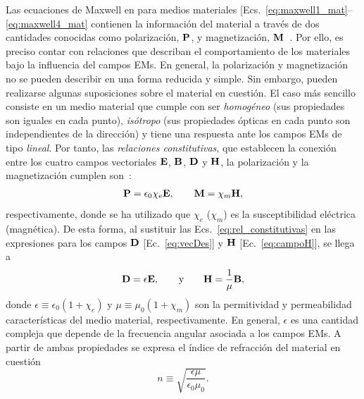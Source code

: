 Las ecuaciones de Maxwell en para medios materiales  [Ecs.~\eqref{eq:maxwell1_mat}--\eqref{eq:maxwell4_mat} contienen la información del material a través de dos cantidades conocidas como polarización, $\vb{P}$, y magnetización, $\vb{M}$~\cite{griffiths2013electrodynamics}. Por ello, es preciso contar con relaciones que describan el comportamiento de los materiales bajo la influencia del campos EMs. En general, la polarización y magnetización no se pueden describir en una forma reducida y simple. Sin embargo, pueden realizarse algunas suposiciones sobre el material en cuestión. El caso más sencillo consiste en un medio material que cumple con ser \textit{homogéneo} (sus propiedades son iguales en cada punto), \textit{isótropo} (sus propiedades ópticas en cada punto son independientes de la dirección) y tiene una respuesta ante los campos EMs de tipo \textit{lineal}. Por tanto, las \textit{relaciones constitutivas}, que establecen la conexión entre los cuatro campos vectoriales $\vb{E}$, $\vb{B}$, $\vb{D}$ y $\vb{H}$, la polarización y la magnetización cumplen son~\cite{griffiths2013electrodynamics}:
%
\begin{eqnarray}
\vb{P}=\epsilon_{0}\chi_{e}\vb{E},\qquad \vb{M}=\chi_{m}\vb{H},\label{eq:rel_constitutivas}
\end{eqnarray} 
%
respectivamente, donde se ha utilizado que $\chi_{e}$ ($\chi_{m}$) es la susceptibilidad eléctrica (magnética). De esta forma, al sustituir las Ecs.~\eqref{eq:rel_constitutivas} en las expresiones para los campos $\vb{D}$ [Ec.~\eqref{eq:vecDes}] y $\vb{H}$ [Ec.~\eqref{eq:campoH}], se llega a~\cite{griffiths2013electrodynamics}
\begin{eqnarray}
\vb{D}=\epsilon\vb{E}, \qquad \text{y} \qquad
\vb{H}=\frac{1}{\mu} \vb{B}, \label{eq:hache}
\end{eqnarray}
donde  $\epsilon\equiv\epsilon_{0}\left(1+\chi_{e}\right)$ y $\mu\equiv\mu_{0}\left(1+\chi_{m}\right)$ son la permitividad y permeabilidad características del medio material, respectivamente. En general, $\epsilon$ es una cantidad compleja que depende de la frecuencia angular asociada a los campos EMs. A partir de ambas propiedades se expresa el índice de refracción del material en cuestión~\cite{griffiths2013electrodynamics}
%
\begin{equation}
n\equiv\sqrt{\frac{\epsilon\mu}{\epsilon_{0}\mu_{0}}}.
\end{equation}

